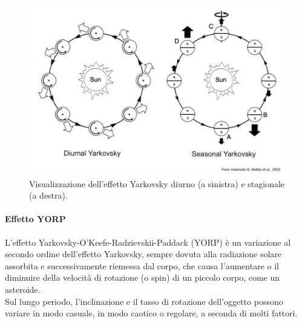 \begin{figure}[!h]
    \centering
    \includegraphics[scale=0.38]{figure/yark.jpg}
    \caption[Visualizzazione dell'effetto Yarkovsky diurno e stagionale.]{Visualizzazione dell'effetto Yarkovsky diurno (a sinistra) e stagionale (a destra). \citep{bottke_yarkovsky_2002}}
    \label{fig:yark}
\end{figure}

\paragraph*{Effetto YORP}
L’effetto Yarkovsky-O'Keefe-Radzievskii-Paddack (YORP) è un variazione al secondo ordine dell’effetto Yarkovsky, sempre dovuta alla radiazione solare assorbita e successivamente riemessa dal corpo, che causa l’aumentare o il diminuire della velocità di rotazione (o spin) di un piccolo corpo, come un asteroide.\\
Sul lungo periodo, l'inclinazione e il tasso di rotazione dell'oggetto possono variare in modo casuale, in modo caotico o regolare, a seconda di molti fattori.

